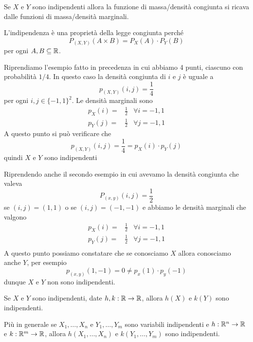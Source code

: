 \begin{observation}
	Se $X$ e $Y$ sono indipendenti allora la funzione di massa/densità congiunta si ricava dalle
	funzioni di massa/densità marginali.

	L'indipendenza è una proprietà della legge congiunta perché
	\[ P_{(X,Y)} (A \times B) = P_X(A) \cdot P_Y(B) \]
	per ogni $A, B \subseteq \mathbb{R}$.
\end{observation}

\begin{example}
	Riprendiamo l'esempio fatto in precedenza in cui abbiamo 4 punti, ciascuno con probabilità
	$1/4$. In questo caso la densità congiunta di $i$ e $j$ è uguale a
	\[ p_{(X,Y)} (i,j) = \frac{1}{4} \]
	per ogni $i,j \in \{ -1, 1 \}^2$. Le densità marginali sono
	\begin{align*}
		p_X(i) = & \frac{1}{2} & \forall i = -1, 1 \\
		p_Y(j) = & \frac{1}{2} & \forall j = -1, 1
	\end{align*}
	A questo punto si può verificare che
	\[ p_{(X,Y)} (i,j) = \frac{1}{4} = p_X(i) \cdot p_Y(j) \]
	quindi $X$ e $Y$ sono indipendenti
\end{example}

\begin{example}
	Riprendendo anche il secondo esempio in cui avevamo la densità congiunta che valeva
	\[ P_{(x,y)} (i,j) = \frac{1}{2} \]
	se $(i,j) = (1,1)$ o se $(i,j) = (-1,-1)$ e abbiamo le densità marginali che valgono
	\begin{align*}
		p_X(i) = & \frac{1}{2} & \forall i = -1, 1 \\
		p_Y(j) = & \frac{1}{2} & \forall j = -1, 1 \\
	\end{align*}
	A questo punto possiamo constatare che se conosciamo $X$ allora conosciamo anche $Y$, per
	esempio
	\[ p_{(x,y)} (1,-1) = 0 \neq p_x(1) \cdot p_y(-1) \]
	dunque $X$ e $Y$ non sono indipendenti.
\end{example}

\begin{proposition}
	Se $X$ e $Y$ sono indipendenti, date $h, k : \mathbb{R} \to \mathbb{R}$, allora $h(X)$ e $k(Y)$ sono
	indipendenti.

	Più in generale se $X_1, \dots, X_n$ e $Y_1, \dots, Y_m$ sono variabili indipendenti e
	$h : \mathbb{R}^n \to \mathbb{R}$ e $k : \mathbb{R}^m \to \mathbb{R}$, allora $h(X_1, \dots, X_n)$ e $k(Y_1, \dots, Y_m)$ sono
	indipendenti.
\end{proposition}

